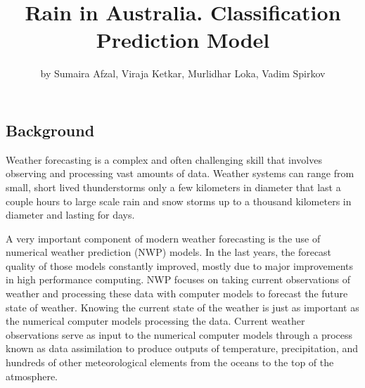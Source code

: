 \title{Rain in Australia. Classification Prediction Model}
\author{by Sumaira Afzal, Viraja Ketkar, Murlidhar Loka, Vadim Spirkov}

\maketitle



\hypertarget{background}{%
\subsection{Background}\label{background}}

Weather forecasting is a complex and often challenging skill that
involves observing and processing vast amounts of data. Weather systems
can range from small, short lived thunderstorms only a few kilometers in
diameter that last a couple hours to large scale rain and snow storms up
to a thousand kilometers in diameter and lasting for days.

A very important component of modern weather forecasting is the use of
numerical weather prediction (NWP) models. In the last years, the
forecast quality of those models constantly improved, mostly due to
major improvements in high performance computing. NWP focuses on taking
current observations of weather and processing these data with computer
models to forecast the future state of weather. Knowing the current
state of the weather is just as important as the numerical computer
models processing the data. Current weather observations serve as input
to the numerical computer models through a process known as data
assimilation to produce outputs of temperature, precipitation, and
hundreds of other meteorological elements from the oceans to the top of
the atmosphere. \cite{ams}

